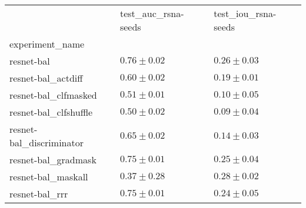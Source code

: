 \begin{tabular}{lll}
\toprule
{} & test_auc_rsna-seeds & test_iou_rsna-seeds \\
experiment_name          &                     &                     \\
\midrule
resnet-bal               &       $0.76\pm0.02$ &       $0.26\pm0.03$ \\
resnet-bal_actdiff       &       $0.60\pm0.02$ &       $0.19\pm0.01$ \\
resnet-bal_clfmasked     &       $0.51\pm0.01$ &       $0.10\pm0.05$ \\
resnet-bal_clfshuffle    &       $0.50\pm0.02$ &       $0.09\pm0.04$ \\
resnet-bal_discriminator &       $0.65\pm0.02$ &       $0.14\pm0.03$ \\
resnet-bal_gradmask      &       $0.75\pm0.01$ &       $0.25\pm0.04$ \\
resnet-bal_maskall       &       $0.37\pm0.28$ &       $0.28\pm0.02$ \\
resnet-bal_rrr           &       $0.75\pm0.01$ &       $0.24\pm0.05$ \\
\bottomrule
\end{tabular}
